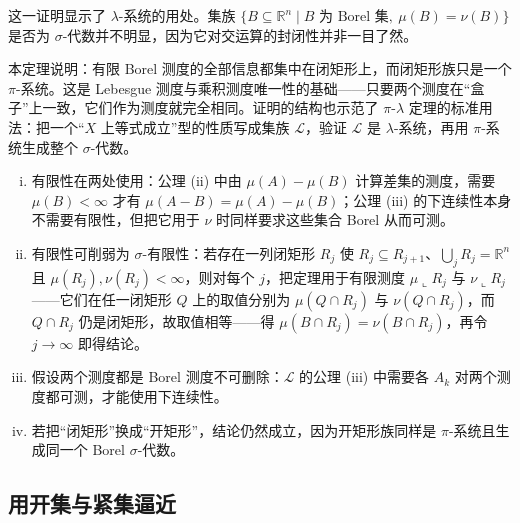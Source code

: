 \documentclass[../../main.tex]{subfiles}
\begin{document}
\begin{remark}\label{remark:ch01-thm-1-5-用法}
这一证明显示了 $\lambda$-系统的用处。集族 $\{B\subseteq\mathbb{R}^{n}\mid B\text{ 为 Borel 集},\ \mu(B)=\nu(B)\}$ 是否为 $\sigma$-代数并不明显，因为它对交运算的封闭性并非一目了然。
\end{remark}

\begin{remark}\label{remark:ch01-thm-1-5-动机}
本定理说明：有限 Borel 测度的全部信息都集中在闭矩形上，而闭矩形族只是一个 $\pi$-系统。这是 Lebesgue 测度与乘积测度唯一性的基础——只要两个测度在“盒子”上一致，它们作为测度就完全相同。证明的结构也示范了 $\pi$-$\lambda$ 定理的标准用法：把一个“$X$ 上等式成立”型的性质写成集族 $\mathcal{L}$，验证 $\mathcal{L}$ 是 $\lambda$-系统，再用 $\pi$-系统生成整个 $\sigma$-代数。
\end{remark}

\begin{remark}\label{remark:ch01-thm-1-5-条件}
\begin{enumerate}[(i)]
\item 有限性在两处使用：公理 (ii) 中由 $\mu(A)-\mu(B)$ 计算差集的测度，需要 $\mu(B)<\infty$ 才有 $\mu(A-B)=\mu(A)-\mu(B)$；公理 (iii) 的下连续性本身不需要有限性，但把它用于 $\nu$ 时同样要求这些集合 Borel 从而可测。
\item 有限性可削弱为 $\sigma$-有限性：若存在一列闭矩形 $R_{j}$ 使 $R_{j}\subseteq R_{j+1}$、$\bigcup_{j}R_{j}=\mathbb{R}^{n}$ 且 $\mu(R_{j}),\nu(R_{j})<\infty$，则对每个 $j$，把定理用于有限测度 $\mu\llcorner R_{j}$ 与 $\nu\llcorner R_{j}$——它们在任一闭矩形 $Q$ 上的取值分别为 $\mu(Q\cap R_{j})$ 与 $\nu(Q\cap R_{j})$，而 $Q\cap R_{j}$ 仍是闭矩形，故取值相等——得 $\mu(B\cap R_{j})=\nu(B\cap R_{j})$，再令 $j\to\infty$ 即得结论。
\item 假设两个测度都是 Borel 测度不可删除：$\mathcal{L}$ 的公理 (iii) 中需要各 $A_{k}$ 对两个测度都可测，才能使用下连续性。
\item 若把“闭矩形”换成“开矩形”，结论仍然成立，因为开矩形族同样是 $\pi$-系统且生成同一个 Borel $\sigma$-代数。
\end{enumerate}
\end{remark}

\subsection{用开集与紧集逼近}\label{subsection:ch01-01-逼近}
\end{document}
